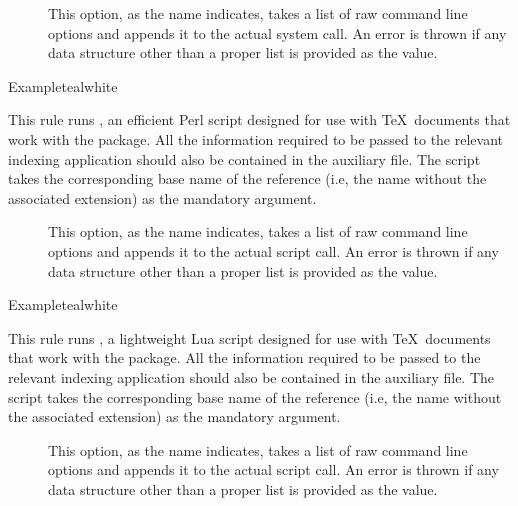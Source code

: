 \begin{description}
\begin{description}
\item[] This option, as the name indicates, takes a list of raw command line options and appends it to the actual system call. An error is thrown if any data structure other than a proper list is provided as the value.
\end{description}

\begin{codebox}{Example}{teal}{\icnote}{white}
\end{codebox}

\item[\rulebox{makeglossaries}]
This rule runs , an efficient Perl script designed for use with \TeX\ documents that work with the  package. All the information required to be passed to the relevant indexing application should also be contained in the auxiliary file. The script takes the corresponding base name of the  reference (i.e, the name without the associated extension) as the mandatory argument.

\begin{description}
\item[] This option, as the name indicates, takes a list of raw command line options and appends it to the actual script call. An error is thrown if any data structure other than a proper list is provided as the value.
\end{description}

\begin{codebox}{Example}{teal}{\icnote}{white}
\end{codebox}

\item[\rulebox{makeglossarieslite}]
This rule runs , a lightweight Lua script designed for use with \TeX\ documents that work with the  package. All the information required to be passed to the relevant indexing application should also be contained in the auxiliary file. The script takes the corresponding base name of the  reference (i.e, the name without the associated extension) as the mandatory argument.

\begin{description}
\item[] This option, as the name indicates, takes a list of raw command line options and appends it to the actual script call. An error is thrown if any data structure other than a proper list is provided as the value.
\end{description}


\end{description}

